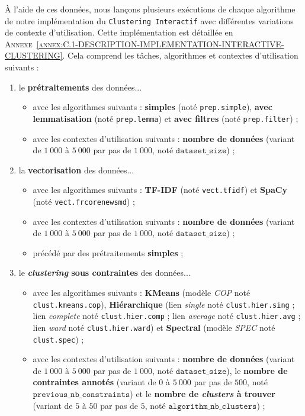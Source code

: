 			À l'aide de ces données, nous lançons plusieurs exécutions de chaque algorithme de notre implémentation du \texttt{Clustering Interactif} avec différentes variations de contexte d'utilisation.
			Cette implémentation est détaillée en \textsc{Annexe~\ref{annex:C.1-DESCRIPTION-IMPLEMENTATION-INTERACTIVE-CLUSTERING}}.
			Cela comprend les tâches, algorithmes et contextes d'utilisation suivants :
			\begin{enumerate}
				\item le \textbf{prétraitements} des données...
					\begin{itemize}
						\item avec les algorithmes suivants : \textbf{simples} (noté \texttt{prep.simple}), \textbf{avec lemmatisation} (noté \texttt{prep.lemma}) et \textbf{avec filtres} (noté \texttt{prep.filter}) ;
						\item avec les contextes d'utilisation suivants : \textbf{nombre de données} (variant de $1~000$ à $5~000$ par pas de $1~000$, noté $\texttt{dataset\_size}$) ;
					\end{itemize}
				\item la \textbf{vectorisation} des données...
					\begin{itemize}
						\item avec les algorithmes suivants : \textbf{TF-IDF} (noté \texttt{vect.tfidf}) et \textbf{SpaCy} (noté \texttt{vect.frcorenewsmd}) ;
						\item avec les contextes d'utilisation suivants : \textbf{nombre de données} (variant de $1~000$ à $5~000$ par pas de $1~000$, noté $\texttt{dataset\_size}$) ;
						\item précédé par des prétraitements \textbf{simples} ;
					\end{itemize}
				\item le \textbf{\textit{clustering} sous contraintes} des données...
					\begin{itemize}
						\item avec les algorithmes suivants : \textbf{KMeans} (modèle \textit{COP} noté \texttt{clust.kmeans.cop}), \textbf{Hiérarchique} (lien \textit{single} noté \texttt{clust.hier.sing} ; lien \textit{complete} noté \texttt{clust.hier.comp} ; lien \textit{average} noté \texttt{clust.hier.avg} ; lien \textit{ward} noté \texttt{clust.hier.ward}) et \textbf{Spectral} (modèle \textit{SPEC} noté \texttt{clust.spec}) ;
						\item avec les contextes d'utilisation suivants : \textbf{nombre de données} (variant de $1~000$ à $5~000$ par pas de $1~000$, noté $\texttt{dataset\_size}$), le \textbf{nombre de contraintes annotés} (variant de $0$ à $5~000$ par pas de $500$, noté $\texttt{previous\_nb\_constraints}$) et le \textbf{nombre de \textit{clusters} à trouver} (variant de $5$ à $50$ par pas de $5$, noté $\texttt{algorithm\_nb\_clusters}$) ;

\end{itemize}
\end{enumerate}
